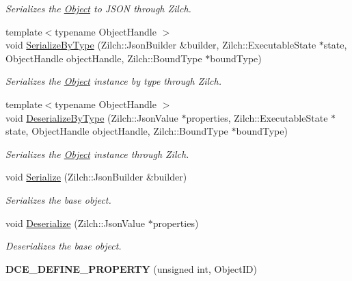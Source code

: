 \begin{DoxyCompactItemize}
\begin{DoxyCompactList}\small\item\em Serializes the \hyperlink{classDCEngine_1_1Object}{Object} to J\-S\-O\-N through Zilch. \end{DoxyCompactList}\item 
{\footnotesize template$<$typename Object\-Handle $>$ }\\void \hyperlink{classDCEngine_1_1Object_a8fc4c492d9a4fdd8368d880542bf4f4b}{Serialize\-By\-Type} (Zilch\-::\-Json\-Builder \&builder, Zilch\-::\-Executable\-State $\ast$state, Object\-Handle object\-Handle, Zilch\-::\-Bound\-Type $\ast$bound\-Type)
\begin{DoxyCompactList}\small\item\em Serializes the \hyperlink{classDCEngine_1_1Object}{Object} instance by type through Zilch. \end{DoxyCompactList}\item 
{\footnotesize template$<$typename Object\-Handle $>$ }\\void \hyperlink{classDCEngine_1_1Object_a5eb060c5cf4f91e5d83413a8ccd0ed4d}{Deserialize\-By\-Type} (Zilch\-::\-Json\-Value $\ast$properties, Zilch\-::\-Executable\-State $\ast$state, Object\-Handle object\-Handle, Zilch\-::\-Bound\-Type $\ast$bound\-Type)
\begin{DoxyCompactList}\small\item\em Serializes the \hyperlink{classDCEngine_1_1Object}{Object} instance through Zilch. \end{DoxyCompactList}\item 
void \hyperlink{classDCEngine_1_1Object_a77d4c41334c102e53196d3a6d7cf7215}{Serialize} (Zilch\-::\-Json\-Builder \&builder)
\begin{DoxyCompactList}\small\item\em Serializes the base object. \end{DoxyCompactList}\item 
\hypertarget{classDCEngine_1_1Object_a183afa5084d313c9647bd7730534cc6b}{void \hyperlink{classDCEngine_1_1Object_a183afa5084d313c9647bd7730534cc6b}{Deserialize} (Zilch\-::\-Json\-Value $\ast$properties)}\label{classDCEngine_1_1Object_a183afa5084d313c9647bd7730534cc6b}

\begin{DoxyCompactList}\small\item\em Deserializes the base object. \end{DoxyCompactList}\item 
\hypertarget{classDCEngine_1_1Object_ae5f1909ad3a1c56cc5dfa802ab5e4ce0}{{\bfseries D\-C\-E\-\_\-\-D\-E\-F\-I\-N\-E\-\_\-\-P\-R\-O\-P\-E\-R\-T\-Y} (unsigned int, Object\-I\-D)}\label{classDCEngine_1_1Object_ae5f1909ad3a1c56cc5dfa802ab5e4ce0}

\end{DoxyCompactItemize}
